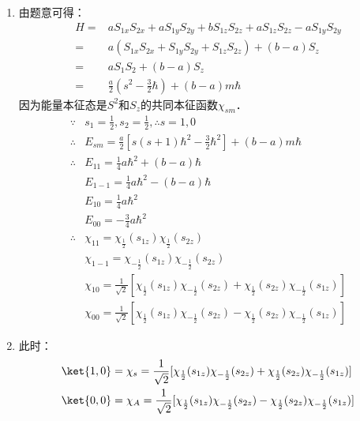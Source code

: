 \subsection{ }
\begin{enumerate}
\item 由题意可得：\\
\begin{equation}
\begin{aligned}
H =& aS_{1x}S_{2x}+aS_{1y}S_{2y}+bS_{1z}S_{2z}+aS_{1z}S_{2z}-aS_{1y}S_{2y} \\
=& a(S_{1x}S_{2x}+S_{1y}S_{2y}+S_{1z}S_{2z})+(b-a)S_{z} \\
=& aS_{1}S_{2}+(b-a)S_z \\
=& \frac{a}{2}(s^{2}-\frac{3}{2}\hbar)+(b-a)m\hbar
\end{aligned}
\end{equation}
因为能量本征态是$S^{2}$和$S_{z}$的共同本征函数$\chi_{sm}$．\\
\begin{equation}
\begin{aligned}
\because & s_{1} = \frac{1}{2},s_{2}=\frac{1}{2},\therefore s=1,0  \\
\therefore & E_{sm} = \frac{a}{2}[s(s+1)\hbar^{2}-\frac{3}{2}\hbar^{2}]+(b-a)m\hbar  \\
\therefore & E_{11} = \frac{1}{4}a\hbar^{2}+(b-a)\hbar  \\
& E_{1-1} = \frac{1}{4}a\hbar^{2}-(b-a)\hbar  \\
& E_{10} = \frac{1}{4}a\hbar^{2}  \\
& E_{00} = -\frac{3}{4}a\hbar^{2}  \\
\therefore & \chi_{11}= \chi_{\frac{1}{2}}(s_{1z})\chi_{\frac{1}{2}}(s_{2z})  \\
& \chi_{1-1} = \chi_{-\frac{1}{2}}(s_{1z})\chi_{-\frac{1}{2}}(s_{2z})  \\
& \chi_{10} = \frac{1}{\sqrt{2}}[\chi_{\frac{1}{2}}(s_{1z})\chi_{-\frac{1}{2}}(s_{2z})+\chi_{\frac{1}{2}}(s_{2z})\chi_{-\frac{1}{2}}(s_{1z})]  \\
& \chi_{00} = \frac{1}{\sqrt{2}}[\chi_{\frac{1}{2}}(s_{1z})\chi_{-\frac{1}{2}}(s_{2z})-\chi_{\frac{1}{2}}(s_{2z})\chi_{-\frac{1}{2}}(s_{1z})]  
\end{aligned}
\end{equation}



\item 此时：\\
\begin{equation}
\begin{aligned}
& \ket{1,0}=\chi_{s}=\frac{1}{\sqrt{2}}[\chi_{\frac{1}{2}}(s_{1z})\chi_{-\frac{1}{2}}(s_{2z})+\chi_{\frac{1}{2}}(s_{2z})\chi_{-\frac{1}{2}}(s_{1z})]  \\
& \ket{0,0}=\chi_{A}=\frac{1}{\sqrt{2}}[\chi_{\frac{1}{2}}(s_{1z})\chi_{-\frac{1}{2}}(s_{2z})-\chi_{\frac{1}{2}}(s_{2z})\chi_{-\frac{1}{2}}(s_{1z})] 
\end{aligned}
\end{equation}

\end{enumerate}